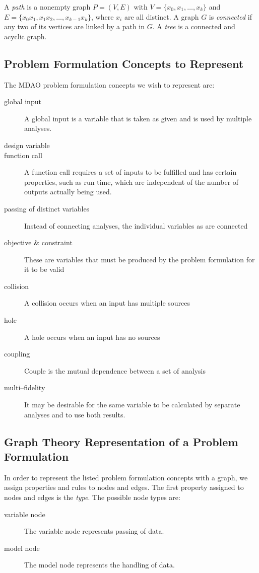  A \emph{path} is a nonempty graph $P = (V,E)$ with $V = \{x_0,x_1,\ldots,x_k\}$ and $E = \{x_0x_1,x_1x_2,\ldots,x_{k-1}x_k\}$, where $x_i$ are all distinct. A graph $G$ is \emph{connected} if any two of its vertices are linked by a path in $G$. A \emph{tree} is a connected and acyclic graph.

\subsection{Problem Formulation Concepts to Represent}
The MDAO problem formulation concepts we wish to represent are:
\begin{description}
\item[global input] A global input is a variable that is taken as given and is used by multiple analyses.
\item[design variable]
\item[function call] A function call requires a set of inputs to be fulfilled and has certain properties, such as run time, which are independent of the number of outputs actually being used.
\item[passing of distinct variables] Instead of connecting analyses, the individual variables as are connected
\item[objective \& constraint] These are variables that must be produced by the problem formulation for it to be valid
\item[collision] A collision occurs when an input has multiple sources
\item[hole] A hole occurs when an input has no sources
\item[coupling] Couple is the mutual dependence between a set of analysis
\item[multi--fidelity] It may be desirable for the same variable to be calculated by separate analyses and to use both results.
\end{description}

\subsection{Graph Theory Representation of a Problem Formulation}
In order to represent the listed problem formulation concepts with a graph, we assign properties and rules to nodes and edges.
The first property assigned to nodes and edges is the \emph{type}. The possible node types are:
\begin{description}
\item[variable node] The variable node represents passing of data.
\item[model node] The model node represents the handling of data.
\end{description}

